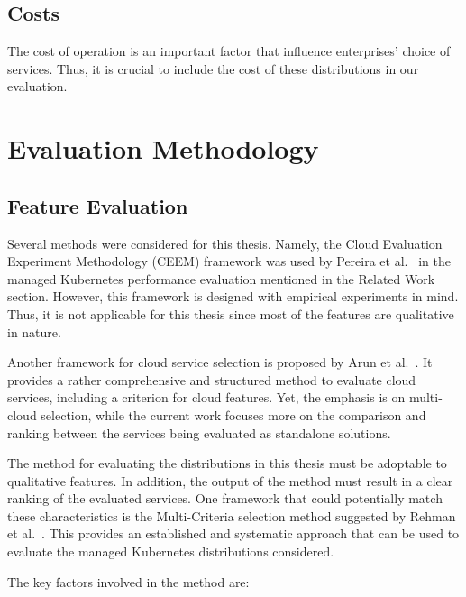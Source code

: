 \section{Costs}

The cost of operation is an important factor that influence enterprises' choice of services. Thus, it is crucial to include the cost of these distributions in our evaluation.

\chapter{Evaluation Methodology}

\section{Feature Evaluation}\label{feature-evaluation}

Several methods were considered for this thesis. Namely, the Cloud
Evaluation Experiment Methodology (CEEM) framework was used by Pereira
et al.~\cite{pereiraferreiraPerformanceEvaluationContainers2019} in the
managed Kubernetes performance evaluation mentioned in the Related Work
section. However, this framework is designed with empirical experiments
in mind. Thus, it is not applicable for this thesis since most of the
features are qualitative in nature.

Another framework for cloud service selection is proposed by Arun et
al.~\cite{9284492}. It provides a rather comprehensive and structured
method to evaluate cloud services, including a criterion for cloud
features. Yet, the emphasis is on multi-cloud selection, while the
current work focuses more on the comparison and ranking between the
services being evaluated as standalone solutions.

The method for evaluating the distributions in this thesis must be
adoptable to qualitative features. In addition, the output of the method
must result in a clear ranking of the evaluated services. One framework
that could potentially match these characteristics is the Multi-Criteria
selection method suggested by Rehman et al.~\cite{5976164}. This
provides an established and systematic approach that can be used to
evaluate the managed Kubernetes distributions considered.

The key factors involved in the method are:

